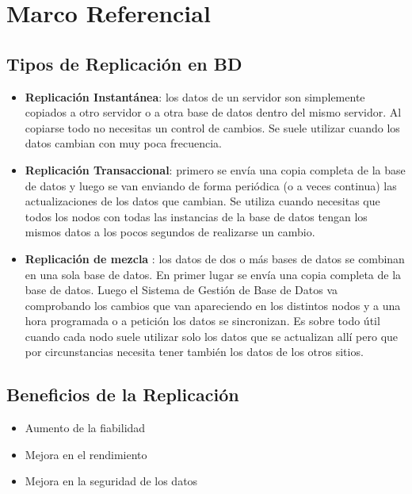 \section{Marco Referencial}

\subsection*{Tipos de Replicación en BD}

\begin{itemize}



\item \textbf{Replicación Instantánea}: los datos de un servidor son simplemente copiados a otro servidor o a otra base de datos dentro del mismo servidor. Al copiarse todo no necesitas un control de cambios. Se suele utilizar cuando los datos cambian con  muy poca frecuencia.
\item  \textbf{Replicación Transaccional}: primero se envía una copia completa de la base de datos y luego se van enviando de forma periódica (o a veces continua) las actualizaciones de los datos que cambian. Se utiliza cuando necesitas que todos los nodos con todas las instancias de la base de datos tengan los mismos datos a los pocos segundos de realizarse un cambio.
\item  \textbf{Replicación de mezcla} : los datos de dos o más bases de datos se combinan en una sola base de datos. En primer lugar se envía una copia completa de la base de datos. Luego el Sistema de Gestión de Base de Datos va comprobando los cambios que van apareciendo en los distintos nodos y a una hora programada o a petición los datos se sincronizan. Es sobre todo útil cuando cada nodo suele utilizar solo los datos que se actualizan allí pero que por circunstancias necesita tener también los datos de los otros sitios.
\end{itemize}


\subsection*{Beneficios de la Replicación}

\begin{itemize}
\item Aumento de la fiabilidad
\item Mejora en el rendimiento

\item Mejora en la seguridad de los datos
\end{itemize}









